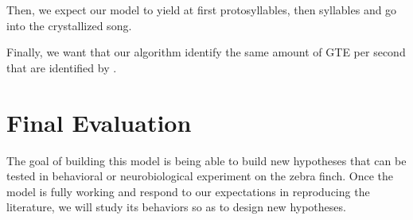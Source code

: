 \documentclass[a4paper, 11pt]{article}
\begin{document}
Then, we expect our model to yield at first protosyllables, then syllables and
go into the crystallized song. 

Finally, we want that our algorithm identify the same amount of GTE per second
that are identified by \textcite{boari_automatic_2015}.

\section*{Final Evaluation}

The goal of building this model is being able to build new hypotheses that can
be tested in behavioral or neurobiological experiment on the zebra finch. Once
the model is fully working and respond to our expectations in reproducing the
literature, we will study its behaviors so as to design new hypotheses.

\printbibliography{}
\end{document}
